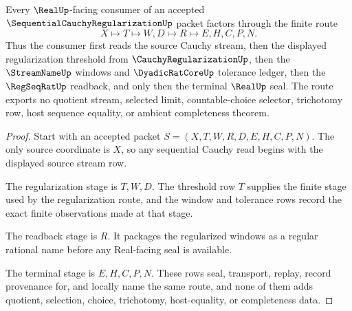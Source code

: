 \begin{theorem}
\label{thm:sequential-cauchy-regularization-real-seal-route}
Every $\RealUp$-facing consumer of an accepted $\SequentialCauchyRegularizationUp$ packet factors through the finite route
$$
X \longmapsto T \longmapsto W,D \longmapsto R \longmapsto E,H,C,P,N .
$$
Thus the consumer first reads the source Cauchy stream, then the displayed regularization threshold from $\CauchyRegularizationUp$, then the $\StreamNameUp$ windows and $\DyadicRatCoreUp$ tolerance ledger, then the $\RegSeqRatUp$ readback, and only then the terminal $\RealUp$ seal. The route exports no quotient stream, selected limit, countable-choice selector, trichotomy row, host sequence equality, or ambient completeness theorem.
\end{theorem}
\begin{proof}
Start with an accepted packet $S=(X,T,W,R,D,E,H,C,P,N)$. The only source coordinate is $X$, so any sequential Cauchy read begins with the displayed source stream row.

The regularization stage is $T,W,D$. The threshold row $T$ supplies the finite stage used by the regularization route, and the window and tolerance rows record the exact finite observations made at that stage.

The readback stage is $R$. It packages the regularized windows as a regular rational name before any Real-facing seal is available.

The terminal stage is $E,H,C,P,N$. These rows seal, transport, replay, record provenance for, and locally name the same route, and none of them adds quotient, selection, choice, trichotomy, host-equality, or completeness data.
\end{proof}



